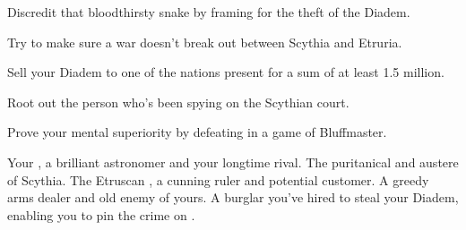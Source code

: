 \documentclass[char]{Kos}
\begin{document}
\begin{itemz}[Goals]
\item Discredit that bloodthirsty snake \cArmsDealer{} by framing \cArmsDealer{\them} for the theft of the Diadem.
\item Try to make sure a war doesn't break out between Scythia and Etruria.
\item Sell your Diadem to one of the nations present for a sum of at least 1.5 million.
\item Root out the person who's been spying on the Scythian court.
\item Prove your mental superiority by defeating \cArmsDealer{} in a game of Bluffmaster.
\end{itemz}

\begin{contacts}
\contact{\cAnarchist{}} Your \cAnarchist{\sibling}, a brilliant astronomer and your longtime rival.
\contact{\cScythiaQueen{}} The puritanical and austere \cScythiaQueen{\monarch} of Scythia.
\contact{\cEtruriaKing{}} The Etruscan \cEtruriaKing{\monarch}, a cunning ruler and potential customer.
\contact{\cArmsDealer{}} A greedy arms dealer and old enemy of yours.
\contact{\cBurglar{}} A burglar you've hired to steal your Diadem, enabling you to pin the crime on \cArmsDealer{}.
\end{contacts}
\end{document}
